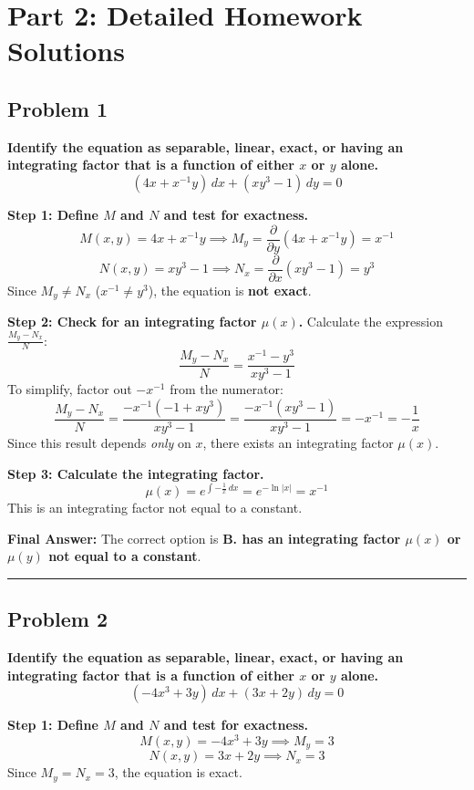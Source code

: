 \documentclass[11pt]{article}
\begin{document}
\newpage
\section{Part 2: Detailed Homework Solutions}

\subsection*{Problem 1}
\textbf{Identify the equation as separable, linear, exact, or having an integrating factor that is a function of either $x$ or $y$ alone.}
\[ (4x + x^{-1}y) \, dx + (xy^3 - 1) \, dy = 0 \]

\textbf{Step 1: Define $M$ and $N$ and test for exactness.}
\[ M(x,y) = 4x + x^{-1}y \implies M_y = \frac{\partial}{\partial y}(4x + x^{-1}y) = x^{-1} \]
\[ N(x,y) = xy^3 - 1 \implies N_x = \frac{\partial}{\partial x}(xy^3 - 1) = y^3 \]
Since $M_y \neq N_x$ ($x^{-1} \neq y^3$), the equation is \textbf{not exact}.

\textbf{Step 2: Check for an integrating factor $\mu(x)$.}
Calculate the expression $\frac{M_y - N_x}{N}$:
\[ \frac{M_y - N_x}{N} = \frac{x^{-1} - y^3}{xy^3 - 1} \]
To simplify, factor out $-x^{-1}$ from the numerator:
\[ \frac{M_y - N_x}{N} = \frac{-x^{-1}(-1 + xy^3)}{xy^3 - 1} = \frac{-x^{-1}(xy^3 - 1)}{xy^3 - 1} = -x^{-1} = -\frac{1}{x} \]
Since this result depends \emph{only} on $x$, there exists an integrating factor $\mu(x)$.

\textbf{Step 3: Calculate the integrating factor.}
\[ \mu(x) = e^{\int -\frac{1}{x} \, dx} = e^{-\ln|x|} = x^{-1} \]
This is an integrating factor not equal to a constant. 

\textbf{Final Answer:} 
The correct option is \textbf{B. has an integrating factor $\mu(x)$ or $\mu(y)$ not equal to a constant}.

\noindent\rule{\textwidth}{0.4pt}

\subsection*{Problem 2}
\textbf{Identify the equation as separable, linear, exact, or having an integrating factor that is a function of either $x$ or $y$ alone.}
\[ (-4x^3 + 3y) \, dx + (3x + 2y) \, dy = 0 \]

\textbf{Step 1: Define $M$ and $N$ and test for exactness.}
\[ M(x,y) = -4x^3 + 3y \implies M_y = 3 \]
\[ N(x,y) = 3x + 2y \implies N_x = 3 \]
Since $M_y = N_x = 3$, the equation is exact. 
\end{document}
